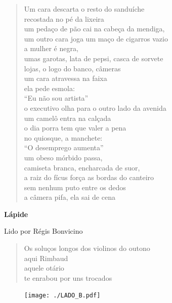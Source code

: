 \begin{verse}
Um cara descarta o resto do sanduíche\\
recostada no pé da lixeira\\
um pedaço de pão cai na cabeça da mendiga,\\
um outro cara joga um maço de cigarros vazio\\
a mulher é negra,\\
umas garotas, lata de pepsi, casca de sorvete\\
lojas, o logo do banco, câmeras\\
um cara atravessa na faixa\\
ela pede esmola:\\
``Eu não sou artista''\\
o executivo olha para o outro lado da avenida\\
um camelô entra na calçada\\
o dia porra tem que valer a pena\\
no quiosque, a manchete:\\
``O desemprego aumenta''\\
um obeso mórbido passa,\\
camiseta branca, encharcada de suor,\\
a raiz do fícus força as bordas do canteiro\\
sem nenhum puto entre os dedos\\
a câmera pifa, ela sai de cena
\end{verse}

\pagebreak

\textbf{Lápide}

Lido por Régis Bonvicino

\begin{verse}
Os soluços longos dos violinos do outono\\
aqui Rimbaud\\
aquele otário\\
te enrabou por uns trocados
\end{verse}

\pagebreak
\thispagestyle{empty}

\movetoevenpage
\thispagestyle{empty}

\begin{absolutelynopagebreak}

\begin{vplace}
\begin{figure}[H]
\begin{adjustwidth}{-3.4cm}{}
  \vspace*{8cm}
  \texttt{[image: ./LADO\_B.pdf]}  
\end{adjustwidth}

\end{figure}
\end{vplace}

\end{absolutelynopagebreak}

